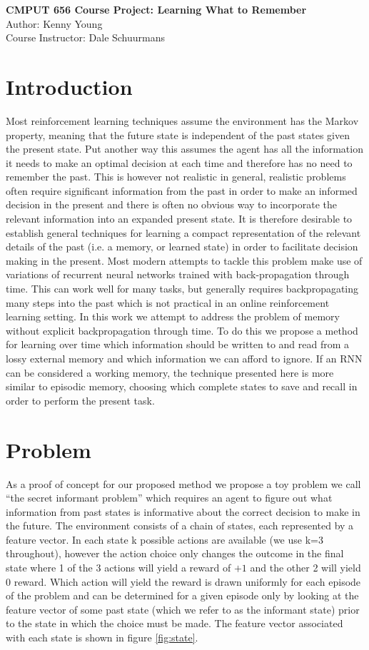 \documentclass{article}
\begin{document}
\begin{center}
{\Large \textbf{CMPUT 656 Course Project: Learning What to Remember}}\\
{Author: Kenny Young}\\
{Course Instructor:  Dale Schuurmans}\\
\end{center}
\section*{Introduction}
Most reinforcement learning techniques assume the environment has the Markov property, meaning that the future state is independent of the past states given the present state. Put another way this assumes the agent has all the information it needs to make an optimal decision at each time and therefore has no need to remember the past. This is however not realistic in general, realistic problems often require significant information from the past in order to make an informed decision in the present and there is often no obvious way to incorporate the relevant information into an expanded present state. It is therefore desirable to establish general techniques for learning a compact representation of the relevant details of the past (i.e. a memory, or learned state) in order to facilitate decision making in the present.
Most modern attempts to tackle this problem make use of variations of recurrent neural networks trained with back-propagation through time. This can work well for many tasks, but generally requires backpropagating many steps into the past which is not practical in an online reinforcement learning setting. In this work we attempt to address the problem of memory without explicit backpropagation through time. To do this we propose a method for learning over time which information should be written to and read from a lossy external memory and which information we can afford to ignore. If an RNN can be considered a working memory, the technique presented here is more similar to episodic memory, choosing which complete states to save and recall in order to perform the present task.

\section*{Problem}
As a proof of concept for our proposed method we propose a toy problem we call ``the secret informant problem'' which requires an agent to figure out what information from past states is informative about the correct decision to make in the future. The environment consists of a chain of states, each represented by a feature vector. In each state k possible actions are available (we use k=3 throughout), however the action choice only changes the outcome in the final state where 1 of the 3 actions will yield a reward of $+1$ and the other 2 will yield $0$ reward. Which action will yield the reward is drawn uniformly for each episode of the problem and can be determined for a given episode only by looking at the feature vector of some past state (which we refer to as the informant state) prior to the state in which the choice must be made. The feature vector associated with each state is shown in figure \ref{fig:state}.
\end{document}
